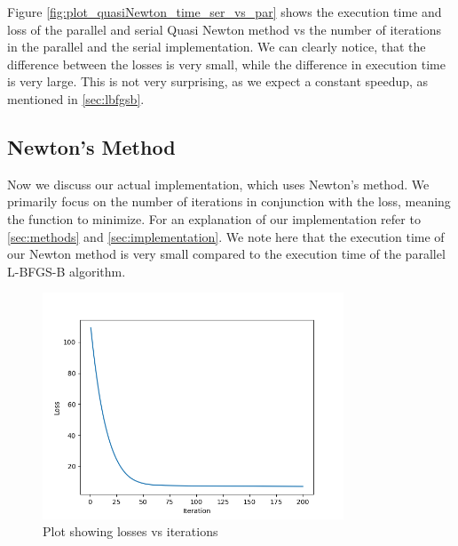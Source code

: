 Figure \ref{fig:plot_quasiNewton_time_ser_vs_par} shows the execution time and loss of the parallel and serial Quasi Newton method vs the number of iterations in the parallel and the serial implementation. 
We can clearly notice, that the difference between the losses is very small, while the difference in execution time is very large. This is not very surprising, as we expect a constant speedup, as mentioned in \ref{sec:lbfgsb}.

\subsection{Newton's Method}

Now we discuss our actual implementation, which uses Newton's method. We primarily focus on the number of iterations in conjunction with the loss, meaning the function to minimize. For an explanation of our implementation refer to
\ref{sec:methods} and \ref{sec:implementation}. We note here that the execution time of our Newton method is very small compared to the execution time of the parallel L-BFGS-B algorithm.

\begin{figure}[H]
    \centering
    \includegraphics[width = 0.8\textwidth]{figures/plot_losses.png}
    \caption[Newton's method: loss vs iteration]{Plot showing losses vs iterations}
    \label{fig:losses_vs_iterations}
\end{figure}

